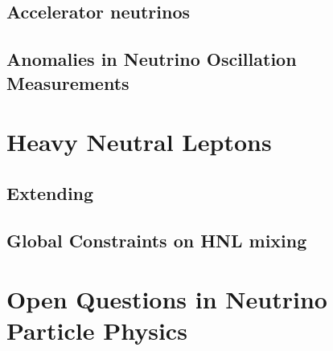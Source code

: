 \subsection{Accelerator neutrinos}

\subsection{Anomalies in Neutrino Oscillation Measurements}


\section{Heavy Neutral Leptons}

\subsection{Extending }

\subsection{Global Constraints on HNL mixing}

\section{Open Questions in Neutrino Particle Physics}
